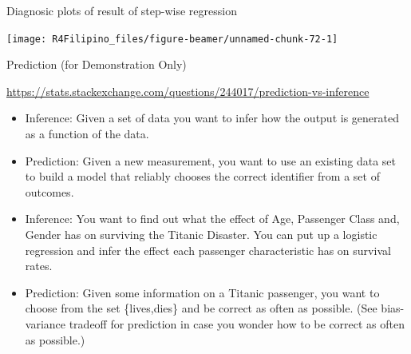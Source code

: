\begin{frame}[fragile]{Diagnosic plots of result of step-wise
regression}

\begin{Shaded}
\begin{Highlighting}[]
\NormalTok{(}\NormalTok{(}\NormalTok{,}\NormalTok{))}
\end{Highlighting}
\end{Shaded}

\begin{center}\texttt{[image: R4Filipino\_files/figure-beamer/unnamed-chunk-72-1]} \end{center}

\end{frame}

\begin{frame}{Prediction (for Demonstration Only)}

\url{https://stats.stackexchange.com/questions/244017/prediction-vs-inference}

\begin{itemize}
\item
  Inference: Given a set of data you want to infer how the output is
  generated as a function of the data.
\item
  Prediction: Given a new measurement, you want to use an existing data
  set to build a model that reliably chooses the correct identifier from
  a set of outcomes.
\item
  Inference: You want to find out what the effect of Age, Passenger
  Class and, Gender has on surviving the Titanic Disaster. You can put
  up a logistic regression and infer the effect each passenger
  characteristic has on survival rates.
\item
  Prediction: Given some information on a Titanic passenger, you want to
  choose from the set \{lives,dies\} and be correct as often as
  possible. (See bias-variance tradeoff for prediction in case you
  wonder how to be correct as often as possible.)
\end{itemize}

\end{frame}

